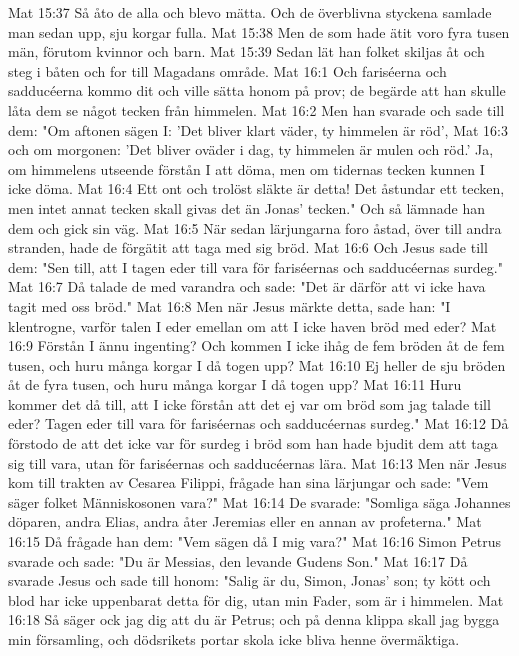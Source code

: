 Mat 15:37  Så åto de alla och blevo mätta. Och de överblivna styckena samlade man sedan upp, sju korgar fulla.
Mat 15:38  Men de som hade ätit voro fyra tusen män, förutom kvinnor och barn.
Mat 15:39  Sedan lät han folket skiljas åt och steg i båten och for till Magadans område.
Mat 16:1  Och fariséerna och sadducéerna kommo dit och ville sätta honom på prov; de begärde att han skulle låta dem se något tecken från himmelen.
Mat 16:2  Men han svarade och sade till dem: "Om aftonen sägen I: 'Det bliver klart väder, ty himmelen är röd',
Mat 16:3  och om morgonen: 'Det bliver oväder i dag, ty himmelen är mulen och röd.' Ja, om himmelens utseende förstån I att döma, men om tidernas tecken kunnen I icke döma.
Mat 16:4  Ett ont och trolöst släkte är detta! Det åstundar ett tecken, men intet annat tecken skall givas det än Jonas' tecken." Och så lämnade han dem och gick sin väg.
Mat 16:5  När sedan lärjungarna foro åstad, över till andra stranden, hade de förgätit att taga med sig bröd.
Mat 16:6  Och Jesus sade till dem: "Sen till, att I tagen eder till vara för fariséernas och sadducéernas surdeg."
Mat 16:7  Då talade de med varandra och sade: "Det är därför att vi icke hava tagit med oss bröd."
Mat 16:8  Men när Jesus märkte detta, sade han: "I klentrogne, varför talen I eder emellan om att I icke haven bröd med eder?
Mat 16:9  Förstån I ännu ingenting? Och kommen I icke ihåg de fem bröden åt de fem tusen, och huru många korgar I då togen upp?
Mat 16:10  Ej heller de sju bröden åt de fyra tusen, och huru många korgar I då togen upp?
Mat 16:11  Huru kommer det då till, att I icke förstån att det ej var om bröd som jag talade till eder? Tagen eder till vara för fariséernas och sadducéernas surdeg."
Mat 16:12  Då förstodo de att det icke var för surdeg i bröd som han hade bjudit dem att taga sig till vara, utan för fariséernas och sadducéernas lära.
Mat 16:13  Men när Jesus kom till trakten av Cesarea Filippi, frågade han sina lärjungar och sade: "Vem säger folket Människosonen vara?"
Mat 16:14  De svarade: "Somliga säga Johannes döparen, andra Elias, andra åter Jeremias eller en annan av profeterna."
Mat 16:15  Då frågade han dem: "Vem sägen då I mig vara?"
Mat 16:16  Simon Petrus svarade och sade: "Du är Messias, den levande Gudens Son."
Mat 16:17  Då svarade Jesus och sade till honom: "Salig är du, Simon, Jonas' son; ty kött och blod har icke uppenbarat detta för dig, utan min Fader, som är i himmelen.
Mat 16:18  Så säger ock jag dig att du är Petrus; och på denna klippa skall jag bygga min församling, och dödsrikets portar skola icke bliva henne övermäktiga.
